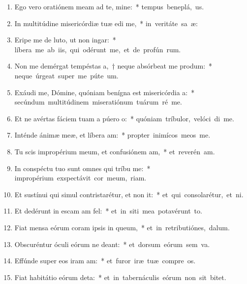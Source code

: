 \begin{flushleft}
\begin{enumerate}[leftmargin=*]
\item Ego vero oratiónem meam ad te, mine:~* \mbox{tempus beneplá, us.}
\item In multitúdine misericórdiæ tuæ edi me,~* \mbox{in veritáte sa æ:}
\item Eripe me de luto, ut non ingar:~* \mbox{líbera me ab iis, qui odérunt me, et de profún rum.}
\item Non me demérgat tempéstas a,~† neque absórbeat me produm:~* \mbox{neque úrgeat super me púte  um.}
\item Exáudi me, Dómine, quóniam benígna est misericórdia a:~* \mbox{secúndum multitúdinem miseratiónum tuárum ré  me.}
\item Et ne avértas fáciem tuam a púero o:~* \mbox{quóniam tríbulor, velóci di me.}
\item Inténde ánimæ meæ, et líbera am:~* \mbox{propter inimícos meos  me.}
\item Tu scis impropérium meum, et confusiónem am,~* \mbox{et reverén am.}
\item In conspéctu tuo sunt omnes qui tríbu me:~* \mbox{impropérium exspectávit cor meum,  riam.}
\item Et sustínui qui simul contristarétur, et non it:~* \mbox{et qui consolarétur, et  ni.}
\item Et dedérunt in escam am fel:~* \mbox{et in siti mea potavérunt  to.}
\item Fiat mensa eórum coram ipsis in queum,~* \mbox{et in retributiónes,   dalum.}
\item Obscuréntur óculi eórum ne deant:~* \mbox{et dorsum eórum sem va.}
\item Effúnde super eos iram am:~* \mbox{et furor iræ tuæ compre os.}
\item Fiat habitátio eórum deta:~* \mbox{et in tabernáculis eórum non sit  bitet.}

\end{enumerate}
\end{flushleft}
